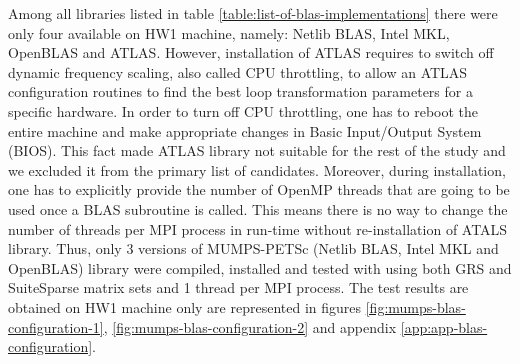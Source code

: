 Among all libraries listed in table \ref{table:list-of-blas-implementations} there were only four available on HW1 machine, namely: Netlib BLAS, Intel MKL, OpenBLAS and ATLAS. However, installation of ATLAS requires to switch off dynamic frequency scaling, also called CPU throttling, to allow an ATLAS configuration routines to find the best loop transformation parameters for a specific hardware. In order to turn off CPU throttling, one has to reboot the entire machine and make appropriate changes in Basic Input/Output System (BIOS). This fact made ATLAS library not suitable for the rest of the study and we excluded it from the primary list of candidates. Moreover, during installation, one has to explicitly provide the number of OpenMP threads that are going to be used once a BLAS subroutine is called. This means there is no way to change the number of threads per MPI process in run-time without re-installation of ATALS library. Thus, only 3 versions of MUMPS-PETSc (Netlib BLAS, Intel MKL and OpenBLAS) library were compiled, installed and tested with using both GRS and SuiteSparse matrix sets and 1 thread per MPI process. The test results are obtained on HW1 machine only are represented in figures \ref{fig:mumps-blas-configuration-1}, \ref{fig:mumps-blas-configuration-2} and appendix \ref{app:app-blas-configuration}.\\


